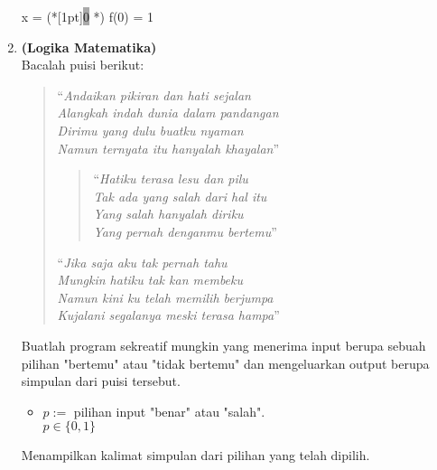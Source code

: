 \documentclass{article}
\newcommand{\enter}{\raisebox{-1.8pt}{\begin{tikzpicture}[scale=0.3]
    \draw[thin,fill=lightgray] (0,0) rectangle (2,1);
    \draw (0.3,0.3) -- (0.7,0.3)--(0.7,0.6);     
\end{tikzpicture}}}
\newcommand{\inputscan}[1]{\raisebox{0pt}[1pt]{\colorbox{darkgray}{#1}}}
\begin{document}
\begin{enumerate}[label=\textbf{\arabic*.}]
        \begin{RunCode+}
x = (*\inputscan{0} \enter*)
f(0) = 1  
        \end{RunCode+}
        \newpage
        \item \textbf{(Logika Matematika)}\\
        Bacalah puisi berikut:
        \begin{quote}
            ``\textit{Andaikan pikiran dan hati sejalan\\
            Alangkah indah dunia dalam pandangan\\
            Dirimu yang dulu buatku nyaman\\
            Namun ternyata itu hanyalah khayalan}''
            \begin{quote}
                ``\textit{Hatiku terasa lesu dan pilu\\
                Tak ada yang salah dari hal itu\\
                Yang salah hanyalah diriku\\
                Yang pernah denganmu bertemu}''
            \end{quote}
            ``\textit{Jika saja aku tak pernah tahu\\
            Mungkin hatiku tak kan membeku\\
            Namun kini ku telah memilih berjumpa\\
            Kujalani segalanya meski terasa hampa}''
        \end{quote}
        Buatlah program sekreatif mungkin yang menerima input berupa sebuah pilihan "bertemu" atau "tidak bertemu" dan mengeluarkan output berupa simpulan dari puisi tersebut.
        \begin{req}
            \begin{itemize}
                \item $p:=$ pilihan input "benar" atau "salah".\\
                $p\in\{0,1\}$
            \end{itemize}
        \end{req}
        \begin{out}
            Menampilkan kalimat simpulan dari pilihan yang telah dipilih.
        \end{out}
    \end{enumerate}
\end{document}
